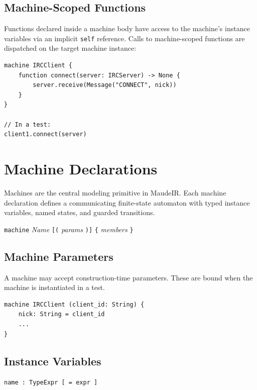 \documentclass[11pt,letterpaper]{article}
\begin{document}
\subsection{Machine-Scoped Functions}

Functions declared inside a machine body have access to the machine's
instance variables via an implicit \texttt{self} reference.  Calls to
machine-scoped functions are dispatched on the target machine instance:

\begin{lstlisting}[numbers=none]
machine IRCClient {
    function connect(server: IRCServer) -> None {
        server.receive(Message("CONNECT", nick))
    }
}

// In a test:
client1.connect(server)
\end{lstlisting}


\section{Machine Declarations}
\label{sec:machines}

Machines are the central modeling primitive in MaudeIR.  Each machine
declaration defines a communicating finite-state automaton with typed
instance variables, named states, and guarded transitions.

\begin{syntaxbox}[machine]
\texttt{machine} \textit{Name} \texttt{[(} \textit{params} \texttt{)]}
  \texttt{\{} \textit{members} \texttt{\}}
\end{syntaxbox}

\subsection{Machine Parameters}

A machine may accept construction-time parameters.  These are bound when
the machine is instantiated in a test.

\begin{lstlisting}[numbers=none]
machine IRCClient (client_id: String) {
    nick: String = client_id
    ...
}
\end{lstlisting}

\subsection{Instance Variables}

\begin{syntaxbox}
\texttt{name : TypeExpr [ = expr ]}
\end{syntaxbox}
\end{document}
